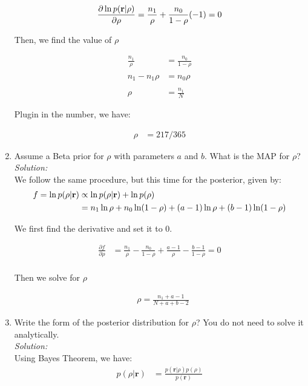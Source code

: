 \documentclass[12pt,a4paper]{article}
\newcommand{\rvec}{{\bf r}}
\begin{document}
\begin{enumerate}
		  \begin{align*}
		  \frac{\partial \ln p(\rvec | \rho)}{\partial \rho} &= \frac{n_1}{\rho} + \frac{n_0}{1 - \rho} (-1) = 0 \\
		  \end{align*}
		  
		  Then, we find the value of $\rho$
		  
		  \begin{align*}
		  \frac{n_1}{\rho} &= \frac{n_0}{1 - \rho} \\ \\
		  n_1 - n_1 \rho &= n_0 \rho \\ \\
		  \rho &= \frac{n_1}{N}
		  \end{align*}
		  
		  Plugin in the number, we have: 
		  
		  \begin{align*}
		  \rho &= 217 / 365
		  \end{align*}
  
  \item Assume a Beta prior for $\rho$ with parameters $a$ and $b$.  What is the MAP for $\rho$? \\
	  \emph{Solution:} \\
		  We follow the same procedure, but this time for the posterior, given by: \\        
		  
		  \begin{align*}
		  f = \ln p(\rho | \rvec) &\propto \ln p(\rho | \rvec) + \ln p(\rho) \\
		  &= n_1 \ln \rho + n_0 \ln(1 - \rho) + (a - 1) \ln \rho + (b - 1) \ln(1 - \rho)
		  \end{align*}
		  
		  We first find the derivative and set it to $0$.
		  
		  \begin{align*}
		  \frac{\partial f}{\partial{\rho}} &= \frac{n_1}{\rho}-\frac{n_0}{1-\rho}+\frac{a -1}{\rho}-\frac{b-1}{1-\rho} = 0\\
		  \end{align*}  
		  
		  Then we solve for $\rho$
		  
		  \begin{align*}
		  &\rho= \frac{n_1 + a -1}{N + a +b -2}
		  \end{align*} 
  
  
  \item Write the form of the posterior distribution for $\rho$?  You do not need to solve it analytically. \\
	  \emph{Solution:} \\
		  Using Bayes Theorem, we have: \\
		  \begin{align*}
		  p(\rho\vert\textbf{r}) &= \frac{p(\textbf{r}\vert\rho)p(\rho)}{p(\textbf{r})} \\ \\
		  \end{align*} 
		  

\end{enumerate}
\end{document}
